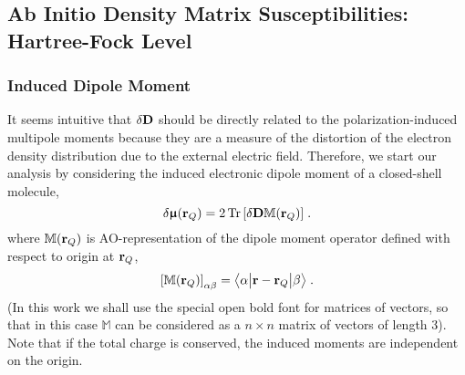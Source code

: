 \documentclass[aip,graphicx]{revtex4-1}
\newcommand{\tbraket}[3]{\ensuremath{\bigl\langle {#1} \bigl\lvert {#2} \bigl\lvert {#3} \bigr\rangle}}
\newcommand{\BM}[1]{\bm{#1}}
\DeclareMathOperator{\Tr}{Tr}
\begin{document}
\subsection{Ab Initio Density Matrix Susceptibilities: Hartree-Fock Level}

\subsubsection{Induced Dipole Moment}

It seems intuitive that $\delta {\bf D}$ should 
be directly related to the
polarization\hyp{}induced multipole moments because they are
a measure of the distortion of the electron density distribution due to the external electric
field. 
Therefore, 
we start our analysis by considering the induced electronic dipole moment 
of a closed-shell molecule, %
%
\begin{equation} \label{e:dmu-exact}
 \delta {\BM{\upmu}}({\bf r}_Q) = 
     2 \Tr{ 
         \left[ 
              \delta {\bf D} {\mathbb{M}({\bf r}_Q)}
         \right] } \;.
\end{equation}
%
where ${\mathbb{M}({\bf r}_Q)}$ is AO\hyp{}representation
of the dipole moment operator defined with respect to origin at ${\bf r}_Q$,
%
\begin{equation}\label{e:m}
 \left[ {\mathbb{M}({\bf r}_Q)} \right]_{\alpha\beta} = \tbraket{\alpha}{{\bf r} - {\bf r}_Q}{\beta} \;.
\end{equation}
%
(In this work we shall use the special open bold font for matrices of vectors, so that
in this case ${\mathbb{M}}$ can be considered as a $n \times n$ matrix of vectors of length 3).
Note that if the total charge is conserved, the induced moments are independent on the origin.
\end{document}
